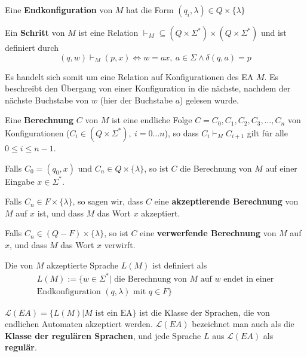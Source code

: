 \begin{definition}
Eine \textbf{Endkonfiguration} von $M$ hat die Form $(q_i, \lambda) \in Q \times \{ \lambda \}$\\
\end{definition}

\begin{definition}
Ein \textbf{Schritt} von $M$ ist eine Relation $\vdash_M \subseteq (Q \times \Sigma^*) \times (Q \times \Sigma^*)$ und ist definiert durch
\[
(q, w) \vdash_{M} (p, x) \Leftrightarrow w = ax,\ a \in \Sigma \land \delta(q, a) = p
\]

Es handelt sich somit um eine Relation auf Konfigurationen des EA $M$. Es beschreibt den Übergang von einer Konfiguration in die nächste, nachdem der nächste Buchstabe von $w$ (hier der Buchstabe $a$) gelesen wurde.\\
\end{definition}

\begin{definition}
Eine \textbf{Berechnung} $C$ von $M$ ist eine endliche Folge $C = C_0, C_1, C_2, C_3, \ldots, C_n$ von Konfigurationen ($C_i \in (Q \times \Sigma^*),\ i=0 \ldots n$), so dass $C_i \vdash_M C_{i+1}$ gilt für alle $0 \leq i \leq n-1$.

Falls $C_0 = (q_0, x)$ und $C_n \in Q \times \{ \lambda \}$, so ist $C$  die Berechnung von $M$ auf einer Eingabe $x \in \Sigma^*$.

Falls $C_n \in F \times \{ \lambda \}$, so sagen wir, dass $C$ eine \textbf{akzeptierende Berechnung} von $M$ auf $x$ ist, und dass $M$ das Wort $x$ akzeptiert.

Falls $C_n \in (Q - F) \times \{ \lambda \}$, so ist $C$ eine \textbf{verwerfende Berechnung} von $M$ auf $x$, und dass $M$ das Wort $x$ verwirft.\\
\end{definition}

\begin{definition}
Die von $M$ akzeptierte Sprache $L(M)$ ist definiert als
\begin{align*}
L(M) := \{ w \in \Sigma^* | \text{ die Berechnung von $M$ auf $w$ endet in einer}\\ \text{Endkonfiguration $(q, \lambda)$ mit $q \in F$} \}
\end{align*}
\end{definition}

\begin{definition}
$\mathcal{L}(EA) = \{L(M) | M \text{ ist ein EA} \}$ ist die Klasse der Sprachen, die von endlichen Automaten akzeptiert werden. $\mathcal{L}(EA)$ bezeichnet man auch als die \textbf{Klasse der regulären Sprachen}, und jede Sprache $L$ aus $\mathcal{L}(EA)$ als \textbf{regulär}.\\
\end{definition}

